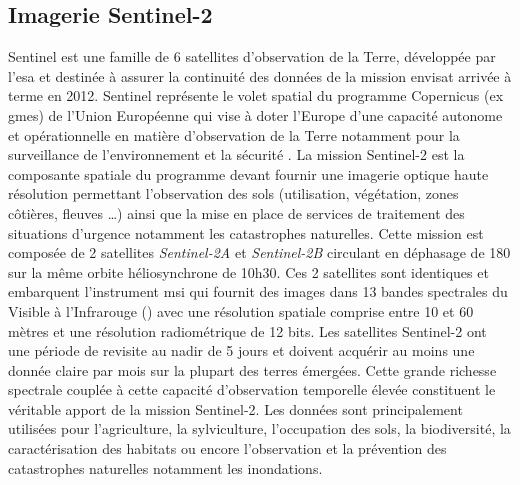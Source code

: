   \subsection{Imagerie Sentinel-2}

Sentinel est une famille de 6 satellites d'observation de la Terre, développée par l'\acrshort{esa} et destinée à assurer la continuité des données de la mission \acrshort{envisat} arrivée à 
terme en 2012. Sentinel représente le volet spatial du programme Copernicus (ex \acrshort{gmes}) de l'Union Européenne qui vise à doter l'Europe d'une capacité autonome et 
opérationnelle en matière d'observation de la Terre notamment pour la surveillance de l'environnement et la sécurité \citep{Drusch2012}. La mission Sentinel-2 est la composante spatiale du programme 
devant fournir une imagerie optique haute résolution permettant l’observation des sols (utilisation, végétation, zones côtières, fleuves \ldots) ainsi que la mise en place de services 
de traitement des situations d'urgence notamment les catastrophes naturelles. Cette mission est composée de 2 satellites \emph{Sentinel-2A} et \emph{Sentinel-2B} circulant en déphasage de 
180\textdegree{} sur la même orbite héliosynchrone de 10h30. Ces 2 satellites sont identiques et embarquent l'instrument \acrshort{msi} qui fournit des images dans 13 bandes spectrales 
du Visible à l'Infrarouge () avec une résolution spatiale comprise entre 10 et 60 mètres et une résolution radiométrique de 12 bits. Les satellites Sentinel-2 ont une période de revisite au nadir de 5 jours et doivent acquérir au moins une donnée claire par mois sur la plupart des terres émergées. Cette grande richesse spectrale couplée à cette capacité d'observation temporelle 
élevée constituent le véritable apport de la mission Sentinel-2. Les données sont principalement utilisées pour l'agriculture, la sylviculture, l'occupation des sols, la biodiversité, 
la caractérisation des habitats ou encore l'observation et la prévention des catastrophes naturelles notamment les inondations. 

